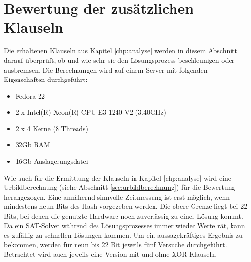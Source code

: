 \chapter{Bewertung der zusätzlichen Klauseln}
\label{chp:bewertung}

Die erhaltenen Klauseln aus Kapitel \ref{chp:analyse} werden in diesem Abschnitt darauf überprüft,
ob und wie sehr sie den Lösungsprozess beschleunigen oder ausbremsen. Die Berechnungen wird auf einem
Server mit folgenden Eigenschaften durchgeführt:
\begin{itemize}
  \item Fedora 22
  \item 2 x Intel(R) Xeon(R) CPU E3-1240 V2 (3.40GHz)
  \item 2 x 4 Kerne (8 Threads)
  \item 32Gb RAM
  \item 16Gb Auslagerungsdatei
\end{itemize}

Wie auch für die Ermittlung der Klauseln in Kapitel \ref{chp:analyse} wird eine Urbildberechnung (siehe Abschnitt \ref{sec:urbildberechnung})
für die Bewertung herangezogen. Eine annähernd sinnvolle Zeitmessung ist erst möglich, wenn mindestens neun Bits des Hash vorgegeben werden.
Die obere Grenze liegt bei 22 Bits, bei denen die genutzte Hardware noch zuverlässig zu einer Lösung kommt. Da ein SAT-Solver während des
Lösungsprozesses immer wieder Werte rät, kann es zufällig zu schnellen Lösungen kommen. Um ein aussagekräftiges Ergebnis zu bekommen, werden
für neun bis 22 Bit jeweils fünf Versuche durchgeführt. Betrachtet wird auch jeweils eine Version mit und ohne XOR-Klauseln.

